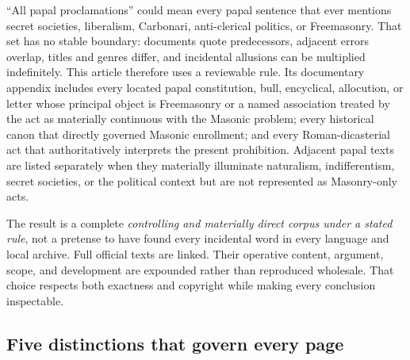 {“All papal proclamations” could mean every papal sentence that ever mentions secret societies, liberalism, Carbonari, anti-clerical politics, or Freemasonry. That set has no stable boundary: documents quote predecessors, adjacent errors overlap, titles and genres differ, and incidental allusions can be multiplied indefinitely. This article therefore uses a reviewable rule. Its documentary appendix includes every located papal constitution, bull, encyclical, allocution, or letter whose principal object is Freemasonry or a named association treated by the act as materially continuous with the Masonic problem; every historical canon that directly governed Masonic enrollment; and every Roman-dicasterial act that authoritatively interprets the present prohibition. Adjacent papal texts are listed separately when they materially illuminate naturalism, indifferentism, secret societies, or the political context but are not represented as Masonry-only acts.

The result is a complete \emph{controlling and materially direct corpus under a stated rule}, not a pretense to have found every incidental word in every language and local archive. Full official texts are linked. Their operative content, argument, scope, and development are expounded rather than reproduced wholesale. That choice respects both exactness and copyright while making every conclusion inspectable.

\subsection{Five distinctions that govern every page}

}
